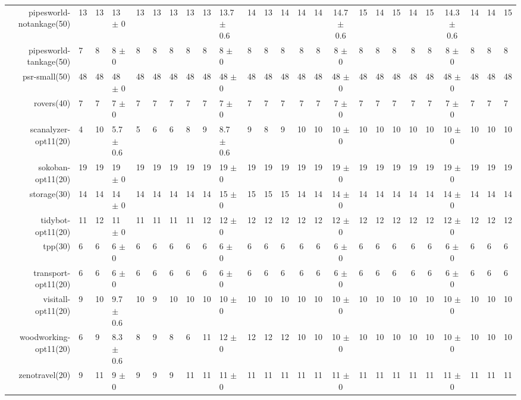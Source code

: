 \begin{center}
\begin{tabular}{|rHHHHHHHHHHHHcccHHH|cccHHH|}
pipesworld-notankage(50) & 13 & 13 & 13 \(\pm\) 0 & 13 & 13 & 13 & 13 & 13 & 13.7 \(\pm\) 0.6 & 14 & 13 & 14 & 14 & 14 & 14.7 \(\pm\) 0.6 & 15 & 14 & 15 & 14 & 15 & 14.3 \(\pm\) 0.6 & 14 & 14 & 15\\
pipesworld-tankage(50) & 7 & 8 & 8 \(\pm\) 0 & 8 & 8 & 8 & 8 & 8 & 8 \(\pm\) 0 & 8 & 8 & 8 & 8 & 8 & 8 \(\pm\) 0 & 8 & 8 & 8 & 8 & 8 & 8 \(\pm\) 0 & 8 & 8 & 8\\
psr-small(50) & 48 & 48 & 48 \(\pm\) 0 & 48 & 48 & 48 & 48 & 48 & 48 \(\pm\) 0 & 48 & 48 & 48 & 48 & 48 & 48 \(\pm\) 0 & 48 & 48 & 48 & 48 & 48 & 48 \(\pm\) 0 & 48 & 48 & 48\\
rovers(40) & 7 & 7 & 7 \(\pm\) 0 & 7 & 7 & 7 & 7 & 7 & 7 \(\pm\) 0 & 7 & 7 & 7 & 7 & 7 & 7 \(\pm\) 0 & 7 & 7 & 7 & 7 & 7 & 7 \(\pm\) 0 & 7 & 7 & 7\\
scanalyzer-opt11(20) & 4 & 10 & 5.7 \(\pm\) 0.6 & 5 & 6 & 6 & 8 & 9 & 8.7 \(\pm\) 0.6 & 9 & 8 & 9 & 10 & 10 & 10 \(\pm\) 0 & 10 & 10 & 10 & 10 & 10 & 10 \(\pm\) 0 & 10 & 10 & 10\\
sokoban-opt11(20) & 19 & 19 & 19 \(\pm\) 0 & 19 & 19 & 19 & 19 & 19 & 19 \(\pm\) 0 & 19 & 19 & 19 & 19 & 19 & 19 \(\pm\) 0 & 19 & 19 & 19 & 19 & 19 & 19 \(\pm\) 0 & 19 & 19 & 19\\
storage(30) & 14 & 14 & 14 \(\pm\) 0 & 14 & 14 & 14 & 14 & 14 & 15 \(\pm\) 0 & 15 & 15 & 15 & 14 & 14 & 14 \(\pm\) 0 & 14 & 14 & 14 & 14 & 14 & 14 \(\pm\) 0 & 14 & 14 & 14\\
tidybot-opt11(20) & 11 & 12 & 11 \(\pm\) 0 & 11 & 11 & 11 & 11 & 12 & 12 \(\pm\) 0 & 12 & 12 & 12 & 12 & 12 & 12 \(\pm\) 0 & 12 & 12 & 12 & 12 & 12 & 12 \(\pm\) 0 & 12 & 12 & 12\\
tpp(30) & 6 & 6 & 6 \(\pm\) 0 & 6 & 6 & 6 & 6 & 6 & 6 \(\pm\) 0 & 6 & 6 & 6 & 6 & 6 & 6 \(\pm\) 0 & 6 & 6 & 6 & 6 & 6 & 6 \(\pm\) 0 & 6 & 6 & 6\\
transport-opt11(20) & 6 & 6 & 6 \(\pm\) 0 & 6 & 6 & 6 & 6 & 6 & 6 \(\pm\) 0 & 6 & 6 & 6 & 6 & 6 & 6 \(\pm\) 0 & 6 & 6 & 6 & 6 & 6 & 6 \(\pm\) 0 & 6 & 6 & 6\\
visitall-opt11(20) & 9 & 10 & 9.7 \(\pm\) 0.6 & 10 & 9 & 10 & 10 & 10 & 10 \(\pm\) 0 & 10 & 10 & 10 & 10 & 10 & 10 \(\pm\) 0 & 10 & 10 & 10 & 10 & 10 & 10 \(\pm\) 0 & 10 & 10 & 10\\
woodworking-opt11(20) & 6 & 9 & 8.3 \(\pm\) 0.6 & 8 & 9 & 8 & 6 & 11 & 12 \(\pm\) 0 & 12 & 12 & 12 & 10 & 10 & 10 \(\pm\) 0 & 10 & 10 & 10 & 10 & 10 & 10 \(\pm\) 0 & 10 & 10 & 10\\
zenotravel(20) & 9 & 11 & 9 \(\pm\) 0 & 9 & 9 & 9 & 11 & 11 & 11 \(\pm\) 0 & 11 & 11 & 11 & 11 & 11 & 11 \(\pm\) 0 & 11 & 11 & 11 & 11 & 11 & 11 \(\pm\) 0 & 11 & 11 & 11\\
\hline
\end{tabular}
\end{center}
